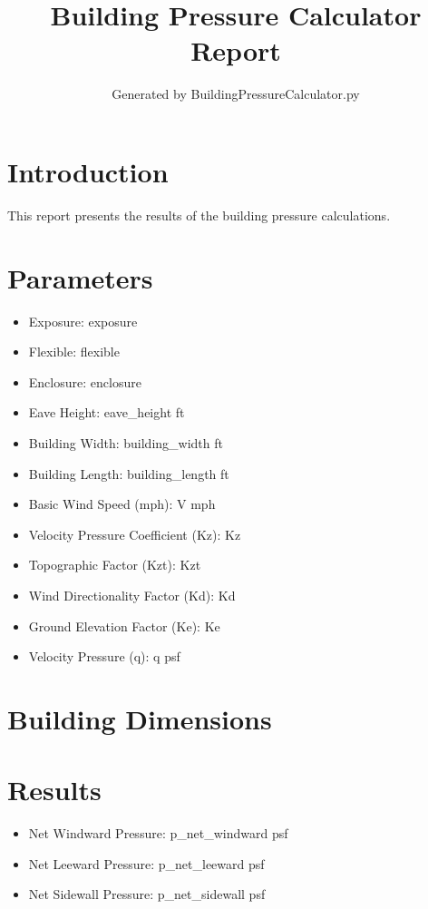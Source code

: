 \documentclass{article}
\title{Building Pressure Calculator Report}
\author{Generated by BuildingPressureCalculator.py}
\begin{document}
\maketitle

\section{Introduction}
This report presents the results of the building pressure calculations.

\section{Parameters}
\begin{itemize}
    \item Exposure: {{ exposure }}
    \item Flexible: {{ flexible }}
    \item Enclosure: {{ enclosure }}
    \item Eave Height: {{ eave_height }} ft
    \item Building Width: {{ building_width }} ft
    \item Building Length: {{ building_length }} ft
    \item Basic Wind Speed (mph): {{ V }} mph
    \item Velocity Pressure Coefficient (Kz): {{ Kz }}
    \item Topographic Factor (Kzt): {{ Kzt }}
    \item Wind Directionality Factor (Kd): {{ Kd }}
    \item Ground Elevation Factor (Ke): {{ Ke }}
    \item Velocity Pressure (q): {{ q }} psf
\end{itemize}

\section{Building Dimensions}

\section{Results}
\begin{itemize}
    \item Net Windward Pressure: {{ p_net_windward }} psf
    \item Net Leeward Pressure: {{ p_net_leeward }} psf
    \item Net Sidewall Pressure: {{ p_net_sidewall }} psf
\end{itemize}
\end{document}
